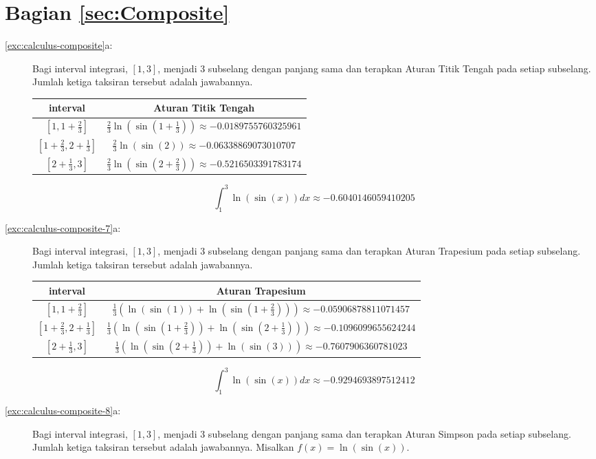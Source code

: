 \section*{Bagian \ref{sec:Composite}}
\begin{description}
\item [{\ref{exc:calculus-composite}a:}] Bagi interval integrasi, $[1,3]$,
menjadi 3 subselang dengan panjang sama dan terapkan Aturan Titik
Tengah pada setiap subselang. Jumlah ketiga taksiran tersebut adalah
jawabannya.

\begin{center}
\begin{tabular}{cc}
interval & Aturan Titik Tengah\tabularnewline
\hline 
$[1,1+\frac{2}{3}]$ & $\frac{2}{3}\ln(\sin(1+\frac{1}{3}))\approx-0.0189755760325961$\tabularnewline
$[1+\frac{2}{3},2+\frac{1}{3}]$ & $\frac{2}{3}\ln(\sin(2))\approx-0.06338869073010707$\tabularnewline
$[2+\frac{1}{3},3]$ & $\frac{2}{3}\ln(\sin(2+\frac{2}{3}))\approx-0.5216503391783174$\tabularnewline
\end{tabular}
\par\end{center}

\begin{center}
\[
\int_{1}^{3}\ln(\sin(x))dx\approx-0.6040146059410205
\]
\par\end{center}
\item [{\ref{exc:calculus-composite-7}a:}] Bagi interval integrasi, $[1,3]$,
menjadi 3 subselang dengan panjang sama dan terapkan Aturan Trapesium
pada setiap subselang. Jumlah ketiga taksiran tersebut adalah jawabannya.

\begin{center}
\begin{tabular}{cc}
interval & Aturan Trapesium\tabularnewline
\hline 
$[1,1+\frac{2}{3}]$ & $\frac{1}{3}\left(\ln(\sin(1))+\ln(\sin(1+\frac{2}{3}))\right)\approx-0.05906878811071457$\tabularnewline
$[1+\frac{2}{3},2+\frac{1}{3}]$ & $\frac{1}{3}\left(\ln(\sin(1+\frac{2}{3}))+\ln(\sin(2+\frac{1}{3}))\right)\approx-0.1096099655624244$\tabularnewline
$[2+\frac{1}{3},3]$ & $\frac{1}{3}\left(\ln(\sin(2+\frac{1}{3}))+\ln(\sin(3))\right)\approx-0.7607906360781023$\tabularnewline
\end{tabular}
\par\end{center}

\begin{center}
\[
\int_{1}^{3}\ln(\sin(x))dx\approx-0.9294693897512412
\]
\par\end{center}
\item [{\ref{exc:calculus-composite-8}a:}] Bagi interval integrasi, $[1,3]$,
menjadi 3 subselang dengan panjang sama dan terapkan Aturan Simpson
pada setiap subselang. Jumlah ketiga taksiran tersebut adalah jawabannya.
Misalkan $f(x)=\ln(\sin(x))$.


\end{description}
